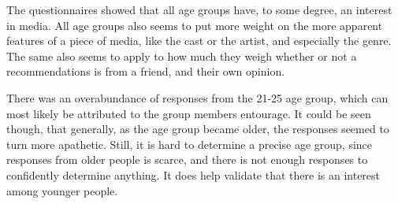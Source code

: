 The questionnaires showed that all age groups have, to some degree, an interest in media. All age groups also seems to put more weight on the more apparent features of a piece of media, like the cast or the artist, and especially the genre. The same also seems to apply to how much they weigh whether or not a recommendations is from a friend, and their own opinion.

There was an overabundance of responses from the 21-25 age group, which can most likely be attributed to the group members entourage. It could be seen though, that generally, as the age group became older, the responses seemed to turn more apathetic. Still, it is hard to determine a precise age group, since responses from older people is scarce, and there is not enough responses to confidently determine anything. It does help validate that there is an interest among younger people. 